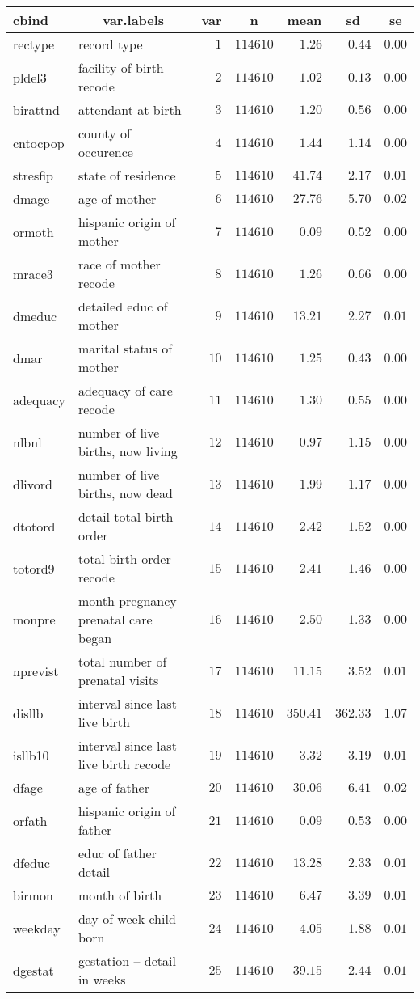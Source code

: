 %
\begin{table}[!tbp]
\begin{center}
\begin{tabular}{llrrrrr}
\hline\hline
\multicolumn{1}{l}{cbind}&\multicolumn{1}{c}{var.labels}&\multicolumn{1}{c}{var}&\multicolumn{1}{c}{n}&\multicolumn{1}{c}{mean}&\multicolumn{1}{c}{sd}&\multicolumn{1}{c}{se}\tabularnewline
\hline
rectype&record type&$ 1$&$114610$&$   1.26$&$  0.44$&$0.00$\tabularnewline
pldel3&facility of birth recode&$ 2$&$114610$&$   1.02$&$  0.13$&$0.00$\tabularnewline
birattnd&attendant at birth&$ 3$&$114610$&$   1.20$&$  0.56$&$0.00$\tabularnewline
cntocpop&county of occurence&$ 4$&$114610$&$   1.44$&$  1.14$&$0.00$\tabularnewline
stresfip&state of residence&$ 5$&$114610$&$  41.74$&$  2.17$&$0.01$\tabularnewline
dmage&age of mother&$ 6$&$114610$&$  27.76$&$  5.70$&$0.02$\tabularnewline
ormoth&hispanic origin of mother&$ 7$&$114610$&$   0.09$&$  0.52$&$0.00$\tabularnewline
mrace3&race of mother recode&$ 8$&$114610$&$   1.26$&$  0.66$&$0.00$\tabularnewline
dmeduc&detailed educ of mother&$ 9$&$114610$&$  13.21$&$  2.27$&$0.01$\tabularnewline
dmar&marital status of mother&$10$&$114610$&$   1.25$&$  0.43$&$0.00$\tabularnewline
adequacy&adequacy of care recode&$11$&$114610$&$   1.30$&$  0.55$&$0.00$\tabularnewline
nlbnl&number of live births, now living&$12$&$114610$&$   0.97$&$  1.15$&$0.00$\tabularnewline
dlivord&number of live births, now dead&$13$&$114610$&$   1.99$&$  1.17$&$0.00$\tabularnewline
dtotord&detail total birth order&$14$&$114610$&$   2.42$&$  1.52$&$0.00$\tabularnewline
totord9&total birth order recode&$15$&$114610$&$   2.41$&$  1.46$&$0.00$\tabularnewline
monpre&month pregnancy prenatal care began&$16$&$114610$&$   2.50$&$  1.33$&$0.00$\tabularnewline
nprevist&total number of prenatal visits&$17$&$114610$&$  11.15$&$  3.52$&$0.01$\tabularnewline
disllb&interval since last live birth&$18$&$114610$&$ 350.41$&$362.33$&$1.07$\tabularnewline
isllb10&interval since last live birth recode&$19$&$114610$&$   3.32$&$  3.19$&$0.01$\tabularnewline
dfage&age of father&$20$&$114610$&$  30.06$&$  6.41$&$0.02$\tabularnewline
orfath&hispanic origin of father&$21$&$114610$&$   0.09$&$  0.53$&$0.00$\tabularnewline
dfeduc&educ of father detail&$22$&$114610$&$  13.28$&$  2.33$&$0.01$\tabularnewline
birmon&month of birth&$23$&$114610$&$   6.47$&$  3.39$&$0.01$\tabularnewline
weekday&day of week child born&$24$&$114610$&$   4.05$&$  1.88$&$0.01$\tabularnewline
dgestat&gestation -- detail in weeks&$25$&$114610$&$  39.15$&$  2.44$&$0.01$\tabularnewline

\end{tabular}
\end{center}
\end{table}
